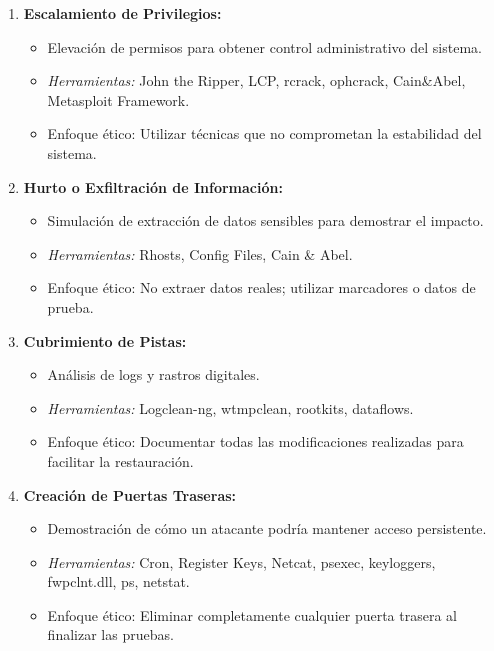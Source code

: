 {\begin{enumerate}
    \item \textbf{Escalamiento de Privilegios:} 
    \begin{itemize}
        \item Elevación de permisos para obtener control administrativo del sistema.
        \item \textit{Herramientas:} John the Ripper, LCP, rcrack, ophcrack, Cain\&Abel, Metasploit Framework.
        \item Enfoque ético: Utilizar técnicas que no comprometan la estabilidad del sistema.
    \end{itemize}

    \item \textbf{Hurto o Exfiltración de Información:} 
    \begin{itemize}
        \item Simulación de extracción de datos sensibles para demostrar el impacto.
        \item \textit{Herramientas:} Rhosts, Config Files, Cain \& Abel.
        \item Enfoque ético: No extraer datos reales; utilizar marcadores o datos de prueba.
    \end{itemize}

    \item \textbf{Cubrimiento de Pistas:} 
    \begin{itemize}
        \item Análisis de logs y rastros digitales.
        \item \textit{Herramientas:} Logclean-ng, wtmpclean, rootkits, dataflows.
        \item Enfoque ético: Documentar todas las modificaciones realizadas para facilitar la restauración.
    \end{itemize}

    \item \textbf{Creación de Puertas Traseras:} 
    \begin{itemize}
        \item Demostración de cómo un atacante podría mantener acceso persistente.
        \item \textit{Herramientas:} Cron, Register Keys, Netcat, psexec, keyloggers, fwpclnt.dll, ps, netstat.
        \item Enfoque ético: Eliminar completamente cualquier puerta trasera al finalizar las pruebas.
    \end{itemize}
\end{enumerate}

}
